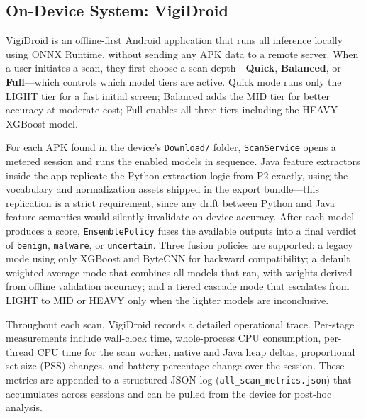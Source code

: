 \documentclass[conference]{IEEEtran}
\begin{document}
	\subsection{On-Device System: VigiDroid}
	
	VigiDroid is an offline-first Android application that runs all inference locally using ONNX Runtime, without sending any APK data to a remote server. When a user initiates a scan, they first choose a scan depth---\textbf{Quick}, \textbf{Balanced}, or \textbf{Full}---which controls which model tiers are active. Quick mode runs only the LIGHT tier for a fast initial screen; Balanced adds the MID tier for better accuracy at moderate cost; Full enables all three tiers including the HEAVY XGBoost model.
	
	For each APK found in the device's \texttt{Download/} folder, \texttt{ScanService} opens a metered session and runs the enabled models in sequence. Java feature extractors inside the app replicate the Python extraction logic from P2 exactly, using the vocabulary and normalization assets shipped in the export bundle---this replication is a strict requirement, since any drift between Python and Java feature semantics would silently invalidate on-device accuracy. After each model produces a score, \texttt{EnsemblePolicy} fuses the available outputs into a final verdict of \texttt{benign}, \texttt{malware}, or \texttt{uncertain}. Three fusion policies are supported: a legacy mode using only XGBoost and ByteCNN for backward compatibility; a default weighted-average mode that combines all models that ran, with weights derived from offline validation accuracy; and a tiered cascade mode that escalates from LIGHT to MID or HEAVY only when the lighter models are inconclusive.
	
	Throughout each scan, VigiDroid records a detailed operational trace. Per-stage measurements include wall-clock time, whole-process CPU consumption, per-thread CPU time for the scan worker, native and Java heap deltas, proportional set size (PSS) changes, and battery percentage change over the session. These metrics are appended to a structured JSON log (\texttt{all\_scan\_metrics.json}) that accumulates across sessions and can be pulled from the device for post-hoc analysis.
	
\end{document}
